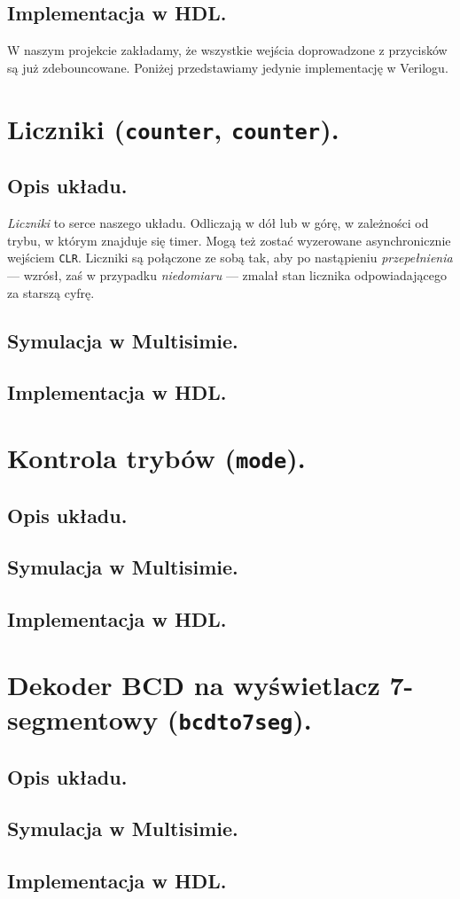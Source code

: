 \documentclass[a4paper,oneside]{report}
\newcommand{\counter}[1]{\texttt{counter\textunderscore #1}}
\newcommand{\mode}{\texttt{mode}}
\newcommand{\bcdtoseg}{\texttt{bcd\textunderscore to\textunderscore 7seg}}
\begin{document}
\subsection{Implementacja w HDL.}
W naszym projekcie zakładamy, że wszystkie wejścia doprowadzone z
przycisków są już zdebouncowane. Poniżej przedstawiamy jedynie
implementację w Verilogu.


\section{Liczniki (\counter{6}, \counter{10}).}
\subsection{Opis układu.}
\emph{Liczniki} to serce naszego układu. Odliczają w dół lub w
górę, w zależności od trybu, w którym znajduje się timer. Mogą też
zostać wyzerowane asynchronicznie wejściem \texttt{CLR}. Liczniki
są połączone ze sobą tak, aby po nastąpieniu \emph{przepełnienia}
--- wzrósł, zaś w przypadku \emph{niedomiaru} --- zmalał stan
licznika odpowiadającego za starszą cyfrę.
\subsection{Symulacja w Multisimie.}
\subsection{Implementacja w HDL.}
\section{Kontrola trybów (\mode).}
\subsection{Opis układu.}
\subsection{Symulacja w Multisimie.}
\subsection{Implementacja w HDL.}
\section{Dekoder BCD na wyświetlacz 7-segmentowy (\bcdtoseg).}
\subsection{Opis układu.}
\subsection{Symulacja w Multisimie.}
\subsection{Implementacja w HDL.}
\end{document}

